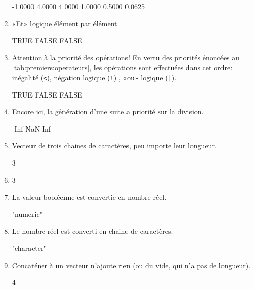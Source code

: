 \begin{exercice}
\begin{sol}
\begin{enumerate}
\begin{Schunk}
\begin{Soutput}
[1] -1.0000  4.0000  4.0000  1.0000  0.5000  0.0625
\end{Soutput}
\end{Schunk}
     \item «Et» logique élément par élément.
\begin{Schunk}
\begin{Soutput}
[1]  TRUE FALSE FALSE
\end{Soutput}
\end{Schunk}
     \item Attention à la priorité des opérations! En vertu des
       priorités énoncées au \autoref{tab:premiers:operateurs}, les
       opérations sont effectuées dans cet ordre: inégalité
       (\verb=<=), négation logique (\verb=!=) , «ou» logique
       (\verb=|=).
\begin{Schunk}
\begin{Soutput}
[1]  TRUE FALSE FALSE
\end{Soutput}
\end{Schunk}
     \item Encore ici, la génération d'une suite a priorité sur la
       division.
\begin{Schunk}
\begin{Soutput}
[1] -Inf  NaN  Inf
\end{Soutput}
\end{Schunk}
     \item Vecteur de trois chaines de caractères, peu importe leur
       longueur.
\begin{Schunk}
\begin{Soutput}
[1] 3
\end{Soutput}
\end{Schunk}
     \item
\begin{Schunk}
\begin{Soutput}
[1] 3
\end{Soutput}
\end{Schunk}
     \item La valeur booléenne est convertie en nombre réel.
\begin{Schunk}
\begin{Soutput}
[1] "numeric"
\end{Soutput}
\end{Schunk}
     \item Le nombre réel est converti en chaine de caractères.
\begin{Schunk}
\begin{Soutput}
[1] "character"
\end{Soutput}
\end{Schunk}
     \item Concaténer  à un vecteur n'ajoute rien (ou du
       vide, qui n'a pas de longueur).
\begin{Schunk}
\begin{Soutput}
[1] 4
\end{Soutput}
\end{Schunk}
     \end{enumerate}
  \end{sol}
\end{exercice}

